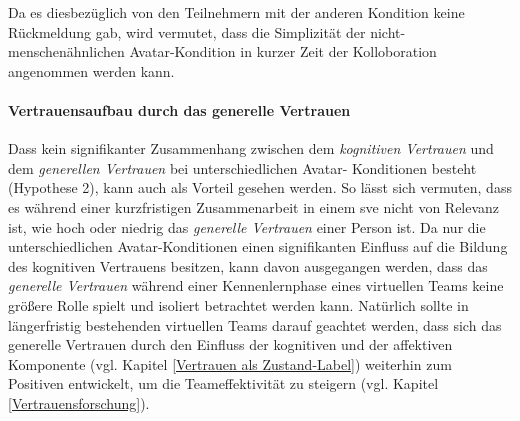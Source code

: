 \documentclass[a4paper,11pt]{article}%
\renewcommand{\\}{\vspace*{0.5\baselineskip} \newline}
\begin{document}
{{Da es diesbezüglich von den Teilnehmern mit der anderen Kondition keine Rückmeldung gab, wird vermutet, dass die Simplizität der nicht-menschenähnlichen Avatar-Kondition in kurzer Zeit der Kolloboration angenommen werden kann.

\paragraph{Vertrauensaufbau durch das generelle Vertrauen}
Dass kein signifikanter Zusammenhang zwischen dem \textit{kognitiven Vertrauen} und dem \textit{generellen Vertrauen} bei unterschiedlichen Avatar- Konditionen besteht (Hypothese 2), kann auch als Vorteil gesehen werden.
So lässt sich vermuten, dass es während einer kurzfristigen Zusammenarbeit in einem \ac{sve} nicht von Relevanz ist, wie hoch oder niedrig das \textit{generelle Vertrauen} einer Person ist. 
Da nur die unterschiedlichen Avatar-Konditionen einen signifikanten Einfluss auf die Bildung des kognitiven Vertrauens besitzen, kann davon ausgegangen werden, dass das \textit{generelle Vertrauen} während einer Kennenlernphase eines virtuellen Teams keine größere Rolle spielt und isoliert betrachtet werden kann. Natürlich sollte in längerfristig bestehenden virtuellen Teams darauf geachtet werden, dass sich das generelle Vertrauen durch den Einfluss der kognitiven und der affektiven Komponente (vgl. Kapitel \ref{Vertrauen als Zustand-Label}) weiterhin zum Positiven entwickelt, um die Teameffektivität zu steigern (vgl. Kapitel \ref{Vertrauensforschung}).
%
%
}}
\end{document}
